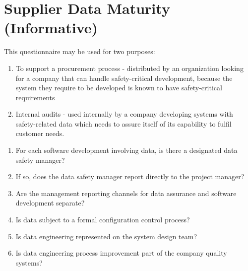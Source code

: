 %
%
\chapter{Supplier Data Maturity (Informative)} \label{bkm:maturity}


This questionnaire may be used for two purposes:
\begin{enumerate}
  \item To support a procurement process - distributed by an organization looking for a company that can handle safety-critical development, because the system they require to be developed is known to have safety-critical requirements
  \item Internal audits - used internally by a company developing systems with safety-related data which needs to assure itself of its capability to fulfil customer needs.
\end{enumerate}

\begin{enumerate}
  \item For each software development involving data, is there a designated data safety manager?
  \item If so, does the data safety manager report directly to the project manager?
  \item Are the management reporting channels for data assurance and software development separate?
  \item Is data subject to a formal configuration control process? 
  \item Is data engineering represented on the system design team?
  \item Is data engineering process improvement part of the company quality systems?
\end{enumerate}

